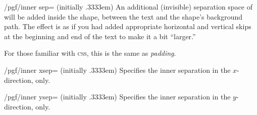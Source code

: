 \begin{key}{/pgf/inner sep= (initially .3333em)}
  An additional (invisible) separation space of  will
  be added inside the shape, between the text and the shape's
  background path. The effect is as if you had added appropriate
  horizontal and vertical skips at the beginning and end of the text
  to make it a bit ``larger.''

  For those familiar with \textsc{css}, this is the same as
  \emph{padding}.

\begin{codeexample}[]
\end{codeexample}
\end{key}

\begin{key}{/pgf/inner xsep= (initially .3333em)}
  Specifies the inner separation in the $x$-direction, only.
\end{key}

\begin{key}{/pgf/inner ysep= (initially .3333em)}
  Specifies the inner separation in the $y$-direction, only.
\end{key}

